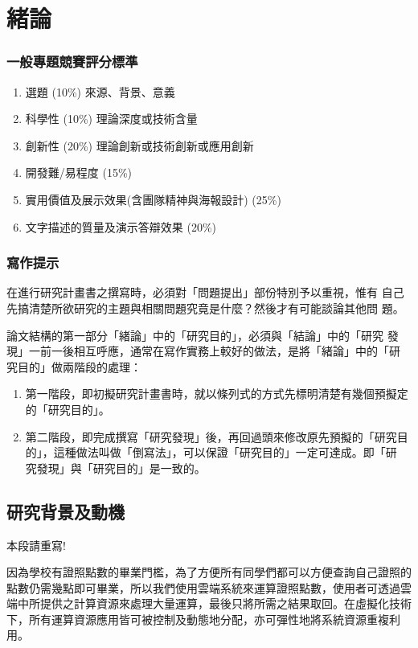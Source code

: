 \chapter{緒論}

  \subsection{一般專題競賽評分標準}

\begin{enumerate}[noitemsep]
\item 選題 (10\%)   來源、背景、意義
\item 科學性 (10\%) 理論深度或技術含量
\item 創新性 (20\%) 理論創新或技術創新或應用創新
\item 開發難/易程度 (15\%)
\item 實用價值及展示效果(含團隊精神與海報設計) (25\%)
\item 文字描述的質量及演示答辯效果 (20\%)
\end{enumerate}

  \subsection{寫作提示}

在進行研究計畫書之撰寫時，必須對「問題提出」部份特別予以重視，惟有
自己先搞清楚所欲研究的主題與相關問題究竟是什麼？然後才有可能談論其他問
題。

論文結構的第一部分「緒論」中的「研究目的」，必須與「結論」中的「研究
發現」一前一後相互呼應，通常在寫作實務上較好的做法，是將「緒論」中的「研
究目的」做兩階段的處理：

\begin{enumerate}[noitemsep]
\item 第一階段，即初擬研究計畫書時，就以條列式的方式先標明清楚有幾個預擬定的「研究目的」。 

\item 第二階段，即完成撰寫「研究發現」後，再回過頭來修改原先預擬的「研究目的」，這種做法叫做「倒寫法」，可以保證「研究目的」一定可達成。即「研
究發現」與「研究目的」是一致的。
\end{enumerate}


  \section{研究背景及動機}

本段請重寫!

因為學校有證照點數的畢業門檻，為了方便所有同學們都可以方便查詢自己證照的點數仍需幾點即可畢業，所以我們使用雲端系統來運算證照點數，使用者可透過雲端中所提供之計算資源來處理大量運算，最後只將所需之結果取回。在虛擬化技術下，所有運算資源應用皆可被控制及動態地分配，亦可彈性地將系統資源重複利用。

